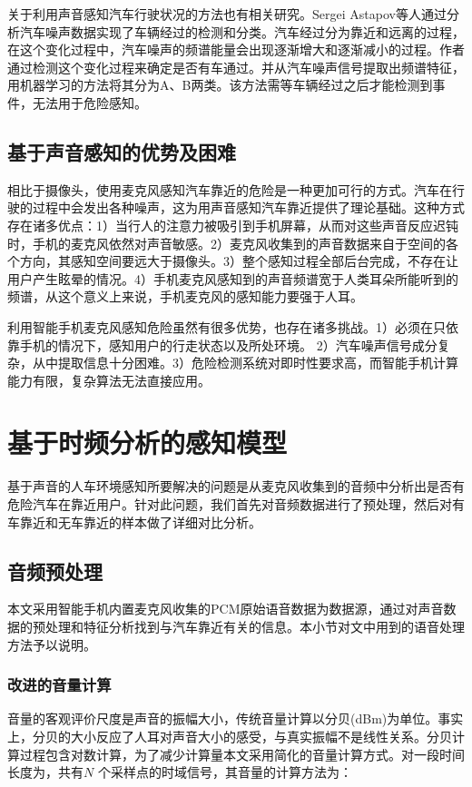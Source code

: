 关于利用声音感知汽车行驶状况的方法也有相关研究。Sergei Astapov等人通过分析汽车噪声数据实现了车辆经过的检测和分类。汽车经过分为靠近和远离的过程，在这个变化过程中，汽车噪声的频谱能量会出现逐渐增大和逐渐减小的过程。作者通过检测这个变化过程来确定是否有车通过。并从汽车噪声信号提取出频谱特征，用机器学习的方法将其分为A、B两类。该方法需等车辆经过之后才能检测到事件，无法用于危险感知。


\subsection{基于声音感知的优势及困难}

相比于摄像头，使用麦克风感知汽车靠近的危险是一种更加可行的方式。汽车在行驶的过程中会发出各种噪声，这为用声音感知汽车靠近提供了理论基础。这种方式存在诸多优点：1）当行人的注意力被吸引到手机屏幕，从而对这些声音反应迟钝时，手机的麦克风依然对声音敏感。2）麦克风收集到的声音数据来自于空间的各个方向，其感知空间要远大于摄像头。3）整个感知过程全部后台完成，不存在让用户产生眩晕的情况。4）手机麦克风感知到的声音频谱宽于人类耳朵所能听到的频谱，从这个意义上来说，手机麦克风的感知能力要强于人耳。


利用智能手机麦克风感知危险虽然有很多优势，也存在诸多挑战。1）必须在只依靠手机的情况下，感知用户的行走状态以及所处环境。 2）汽车噪声信号成分复杂，从中提取信息十分困难。3）危险检测系统对即时性要求高，而智能手机计算能力有限，复杂算法无法直接应用。



\section{基于时频分析的感知模型}
基于声音的人车环境感知所要解决的问题是从麦克风收集到的音频中分析出是否有危险汽车在靠近用户。针对此问题，我们首先对音频数据进行了预处理，然后对有车靠近和无车靠近的样本做了详细对比分析。

\subsection{音频预处理}
本文采用智能手机内置麦克风收集的PCM原始语音数据为数据源，通过对声音数据的预处理和特征分析找到与汽车靠近有关的信息。本小节对文中用到的语音处理方法予以说明。

\subsubsection{改进的音量计算}
音量的客观评价尺度是声音的振幅大小，传统音量计算以分贝(dBm)为单位。事实上，分贝的大小反应了人耳对声音大小的感受，与真实振幅不是线性关系。分贝计算过程包含对数计算，为了减少计算量本文采用简化的音量计算方式。对一段时间长度为，共有$N$ 个采样点的时域信号，其音量的计算方法为：

